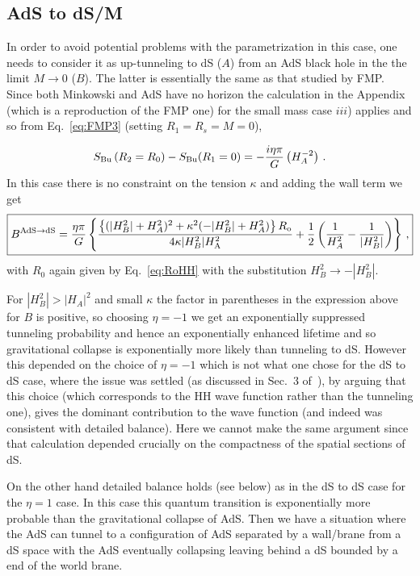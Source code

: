 \documentclass[a4paper,11pt]{article}
\numberwithin{equation}{section}
\newcommand{\citep}{\cite}
\newcommand{\be}{\begin{equation}}
\newcommand{\ee}{\end{equation}}
\numberwithin{equation}{section}
\begin{document}
\subsection{AdS to dS/M}
In order to avoid potential problems with the parametrization in this case, one needs to consider it as up-tunneling to dS ($A$) from an AdS black hole in the the limit $M\rightarrow 0$ ($B$). The latter is essentially the same as that studied by FMP. Since both Minkowski and AdS have no horizon the calculation in the Appendix (which is a reproduction of the FMP one) for the small mass case $iii$) applies and so from Eq.~\eqref{eq:FMP3} (setting $R_1=R_s=M=0$),

\be
\label{eq:FMP3}
S_{{\rm Bu}}\left(R_2=R_{0}\right)-S_{{\rm Bu}}(R_{1}=0)=-\frac{i\eta\pi}{G}\left(H_A^{-2}\right) \,.
\ee
In this case there is no constraint on the tension $\kappa$ and adding the wall term we get
\begin{equation}
\boxed{B^{{\rm AdS \rightarrow dS}}=\frac{\eta\pi}{G}\left\{ \frac{\left\{ (|H_{B}^{2}|+H_{A}^{2})^{2}+\kappa^{2}(-|H_{B}^{2}|+H_{A}^{2})\right\} R_{{\rm o}}}{4\kappa|H_{B}^{2}|H_{{\rm A}}^{2}}+\frac{1}{2}\left(\frac{1}{H_{A}^{2}}-\frac{1}{|H_{B}^{2}|}\right)\right\} \,, }\label{eq:BAdSdS}
\end{equation}
with $R_{0}$ again given by Eq.~\eqref{eq:RoHH} with the substitution
$H_{B}^{2}\rightarrow-|H_{B}^{2}|$.


For $|H_{B}^{2}|>|H_{A}|^{2}$ and small $\kappa$ the factor in
parentheses in the expression above for $B$ is positive, so choosing
$\eta=-1$ we get an exponentially suppressed tunneling probability
and hence an exponentially enhanced lifetime and so gravitational
collapse is exponentially more likely than tunneling to dS. However this depended on the
choice of $\eta=-1$ which is not what one chose for the
dS to dS case, where the issue was settled (as discussed in Sec.~3 of~\citep{DeAlwis:2019rxg}), by arguing that this choice (which corresponds
to the HH wave function rather than the tunneling one), gives the dominant
contribution to the wave function (and indeed was consistent with
detailed balance). Here we cannot make the same argument since that
calculation   depended crucially on the compactness of the spatial
sections of dS. 

On the other hand detailed balance holds (see below) as in the dS to dS case for the
$\eta=1$ case.  In this case this quantum transition is exponentially more probable than the gravitational collapse of AdS.
Then we have a situation where the AdS can tunnel to a configuration
of AdS separated by a wall/brane from a dS space with the AdS eventually
collapsing leaving behind a dS bounded by a end of the world brane. 
\end{document}
